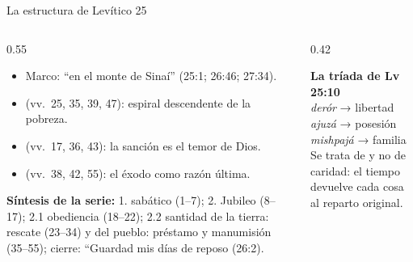 \begin{frame}{La estructura de Levítico 25}
\begin{columns}[c,onlytextwidth]
\begin{column}{0.55\textwidth}\small
\begin{itemize}
\item Marco: ``en el monte de Sinaí'' (25:1; 26:46; 27:34).
\item {} (vv.~25, 35, 39, 47): espiral descendente de la pobreza.
\item {} (vv.~17, 36, 43): la sanción es el temor de Dios.
\item {} (vv.~38, 42, 55): el éxodo como razón última.
\end{itemize}
\scriptsize\RaggedRight\textbf{Síntesis de la serie:} 1. sabático (1--7); 2. Jubileo (8--17); 2.1 obediencia (18--22); 2.2 santidad de la tierra: rescate (23--34) y del pueblo: préstamo y manumisión (35--55); cierre: ``Guardad mis días de reposo (26:2).
\end{column}
\begin{column}{0.42\textwidth}
\begin{tcolorbox}[colback=papiro,colframe=tierraroja,boxrule=0.8pt,arc=3pt,left=4pt,right=4pt]
\centering\small\textbf{\textcolor{tierraroja}{La tríada de Lv 25:10}}\\[4pt]
\scriptsize \emph{derór} → libertad\\ \emph{ajuzá} → posesión\\ \emph{mishpajá} → familia\\[4pt]
\RaggedRight Se trata de  y no de caridad: el tiempo devuelve cada cosa al reparto original.
\end{tcolorbox}
\end{column}
\end{columns}
\end{frame}

